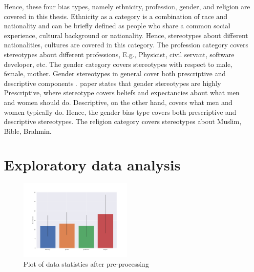 Hence, these four bias types, namely ethnicity, profession, gender, and religion are covered in this thesis. Ethnicity as a category is a combination of race and nationality and can be briefly defined as people who share a common social experience, cultural background or nationality\cite{peoples2014humanity}. Hence, stereotypes about different nationalities, cultures are covered in this category. The profession category covers stereotypes about different professions, E.g., Physicist, civil servant, software developer, etc. The gender category covers stereotypes with respect to male, female, mother. Gender stereotypes in general cover both prescriptive and descriptive components \cite{koenig2018comparing}. \cite{prentice2002women} paper states that gender stereotypes are highly Prescriptive, where stereotype covers beliefs and expectancies about what men and women should do. Descriptive, on the other hand, covers what men and women typically do. Hence, the gender bias type covers both prescriptive and descriptive stereotypes. The religion category covers stereotypes about Muslim, Bible, Brahmin.

\section{Exploratory data analysis}\label{EDA}

\begin{figure}[h]
    \centering
    \includegraphics[width=0.5\textwidth]{thesis/figures/No_words.png}
    \caption{Plot of data statistics after pre-processing}
    \label{fig:No_words}
\end{figure}

